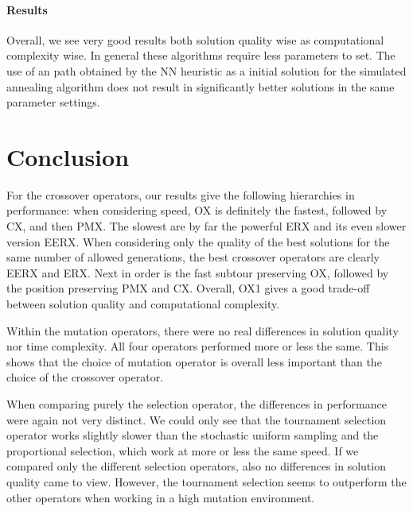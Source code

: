 ﻿\documentclass[a4paper,english,11pt,]{scrartcl}
\begin{document}
\paragraph{Results}
Overall, we see very good results both solution quality wise as computational complexity wise. In general these algorithms require less parameters to set. The use of an path obtained by the NN heuristic as a initial solution for the simulated annealing algorithm does not result in significantly better solutions in the same parameter settings.

\clearpage
\section{Conclusion}
For the crossover operators, our results give the following hierarchies in performance: when considering speed, OX is definitely the fastest, followed by CX, and then PMX. The slowest are by far the powerful ERX and its even slower version EERX. 
When considering only the quality of the best solutions for the same number of allowed generations, the best crossover operators are clearly EERX and ERX. Next in order is the fast subtour preserving OX, followed by the position preserving PMX and CX. 
Overall, OX1 gives a good trade-off between solution quality and computational complexity.

Within the mutation operators, there were no real differences in solution quality nor time complexity. 
All four operators performed more or less the same. This shows that the choice of mutation operator is overall less important than the choice of the crossover operator.

When comparing purely the selection operator, the differences in performance were again not very distinct. We could only see that the tournament selection operator works slightly slower than the stochastic uniform sampling and the proportional selection, which work at more or less the same speed. If we compared only the different selection operators, also no differences in solution quality came to view. However, the tournament selection seems to outperform the other operators when working in a high mutation environment. 
\end{document}
